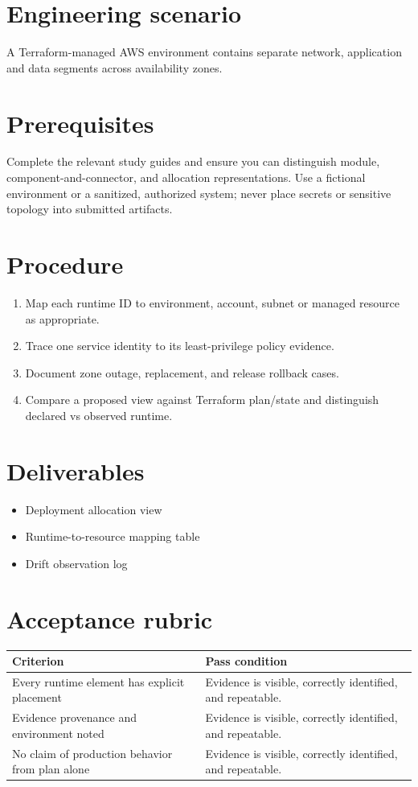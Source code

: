 \documentclass[10pt,letterpaper]{article}
\begin{document}
\DocProvenance
\section{Engineering scenario}
A Terraform-managed AWS environment contains separate network, application and data segments across availability zones.

\section{Prerequisites}
Complete the relevant study guides and ensure you can distinguish module, component-and-connector, and allocation representations. Use a fictional environment or a sanitized, authorized system; never place secrets or sensitive topology into submitted artifacts.

\section{Procedure}
\begin{enumerate}
\item Map each runtime ID to environment, account, subnet or managed resource as appropriate.
\item Trace one service identity to its least-privilege policy evidence.
\item Document zone outage, replacement, and release rollback cases.
\item Compare a proposed view against Terraform plan/state and distinguish declared vs observed runtime.
\end{enumerate}
\section{Deliverables}
\begin{itemize}
\item Deployment allocation view
\item Runtime-to-resource mapping table
\item Drift observation log
\end{itemize}
\section{Acceptance rubric}
\small
\begin{tabularx}{\linewidth}{@{}YY@{}}
\toprule
\textbf{Criterion} & \textbf{Pass condition} \\
\midrule
Every runtime element has explicit placement & Evidence is visible, correctly identified, and repeatable. \\
Evidence provenance and environment noted & Evidence is visible, correctly identified, and repeatable. \\
No claim of production behavior from plan alone & Evidence is visible, correctly identified, and repeatable. \\
\bottomrule
\end{tabularx}
\normalsize
\end{document}
